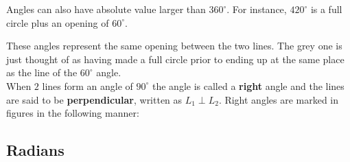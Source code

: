\noindent Angles can also have absolute value larger than $360^{\circ}$. For instance, $420^{\circ}$ is a full circle plus an opening of $60^{\circ}$.
\begin{center}
\end{center}
\noindent These angles represent the same opening between the two lines. The grey one is just thought of as having made a full circle prior to ending up at the same place as the line of the $60^{\circ}$ angle.\\

\noindent When $2$ lines form an angle of $90^{\circ}$ the angle is called a \textbf{right} angle and the lines are said to be \textbf{perpendicular}, written as $L_1 \perp L_2$. Right angles are marked in figures in the following manner: 
\begin{center}
\end{center}

\subsection{Radians}
\label{Radi}

